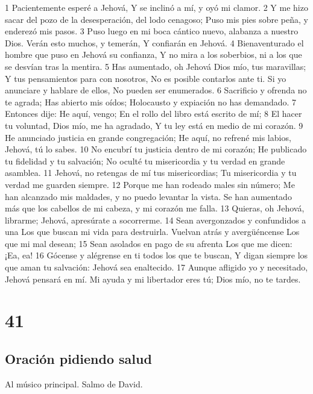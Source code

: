 1 Pacientemente esperé a Jehová,
Y se inclinó a mí, y oyó mi clamor.
2 Y me hizo sacar del pozo de la desesperación, del lodo cenagoso;
Puso mis pies sobre peña, y enderezó mis pasos.
3 Puso luego en mi boca cántico nuevo, alabanza a nuestro Dios.
Verán esto muchos, y temerán,
Y confiarán en Jehová.
4 Bienaventurado el hombre que puso en Jehová su confianza,
Y no mira a los soberbios, ni a los que se desvían tras la mentira.
5 Has aumentado, oh Jehová Dios mío, tus maravillas;
Y tus pensamientos para con nosotros,
No es posible contarlos ante ti.
Si yo anunciare y hablare de ellos,
No pueden ser enumerados.
6 Sacrificio y ofrenda no te agrada;
Has abierto mis oídos;
Holocausto y expiación no has demandado.
7 Entonces dije: He aquí, vengo;
En el rollo del libro está escrito de mí;
8 El hacer tu voluntad, Dios mío, me ha agradado,
Y tu ley está en medio de mi corazón.
9 He anunciado justicia en grande congregación;
He aquí, no refrené mis labios,
Jehová, tú lo sabes.
10 No encubrí tu justicia dentro de mi corazón;
He publicado tu fidelidad y tu salvación;
No oculté tu misericordia y tu verdad en grande asamblea.
11 Jehová, no retengas de mí tus misericordias;
Tu misericordia y tu verdad me guarden siempre.
12 Porque me han rodeado males sin número;
Me han alcanzado mis maldades, y no puedo levantar la vista.
Se han aumentado más que los cabellos de mi cabeza, y mi corazón me falla.
13 Quieras, oh Jehová, librarme;
Jehová, apresúrate a socorrerme.
14 Sean avergonzados y confundidos a una
Los que buscan mi vida para destruirla.
Vuelvan atrás y avergüéncense
Los que mi mal desean;
15 Sean asolados en pago de su afrenta
Los que me dicen: ¡Ea, ea!
16 Gócense y alégrense en ti todos los que te buscan,
Y digan siempre los que aman tu salvación:
Jehová sea enaltecido.
17 Aunque afligido yo y necesitado,
Jehová pensará en mí.
Mi ayuda y mi libertador eres tú;
Dios mío, no te tardes.

\chapter{41}

\section*{Oración pidiendo salud}

Al músico principal. Salmo de David.


